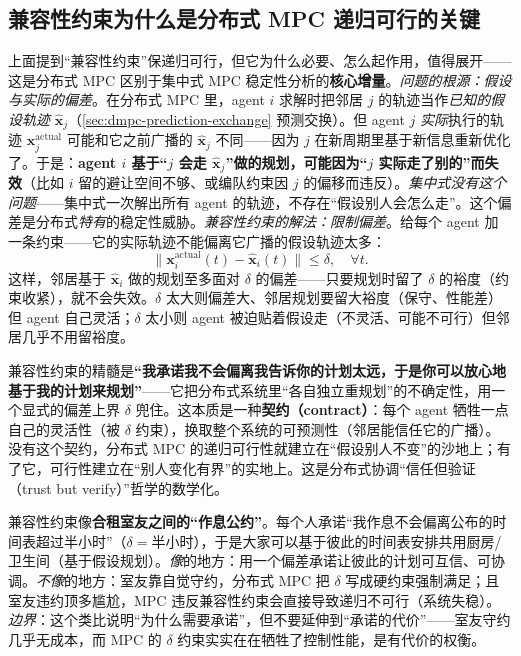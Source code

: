 \subsection{兼容性约束为什么是分布式 MPC 递归可行的关键}
\label{sec:dmpc-compat}

上面提到“兼容性约束”保递归可行，但它为什么必要、怎么起作用，值得展开——这是分布式 MPC 区别于集中式 MPC 稳定性分析的\textbf{核心增量}。\emph{问题的根源：假设与实际的偏差}。在分布式 MPC 里，agent $i$ 求解时把邻居 $j$ 的轨迹当作\emph{已知的假设轨迹} $\hat{\mathbf{x}}_j$（\cref{sec:dmpc-prediction-exchange} 预测交换）。但 agent $j$ \emph{实际}执行的轨迹 $\mathbf{x}_j^{\text{actual}}$ 可能和它之前广播的 $\hat{\mathbf{x}}_j$ 不同——因为 $j$ 在新周期里基于新信息重新优化了。于是：\textbf{agent $i$ 基于“$j$ 会走 $\hat{\mathbf{x}}_j$”做的规划，可能因为“$j$ 实际走了别的”而失效}（比如 $i$ 留的避让空间不够、或编队约束因 $j$ 的偏移而违反）。\emph{集中式没有这个问题}——集中式一次解出所有 agent 的轨迹，不存在“假设别人会怎么走”。这个偏差是分布式\emph{特有}的稳定性威胁。\emph{兼容性约束的解法：限制偏差}。给每个 agent 加一条约束——它的实际轨迹不能偏离它广播的假设轨迹太多：
\begin{equation}
  \|\mathbf{x}_i^{\text{actual}}(t)-\hat{\mathbf{x}}_i(t)\|\le\delta,\quad\forall t.
  \label{eq:dmpc-compat}
\end{equation}
这样，邻居基于 $\hat{\mathbf{x}}_i$ 做的规划至多面对 $\delta$ 的偏差——只要规划时留了 $\delta$ 的裕度（约束收紧），就不会失效。$\delta$ 太大则偏差大、邻居规划要留大裕度（保守、性能差）但 agent 自己灵活；$\delta$ 太小则 agent 被迫贴着假设走（不灵活、可能不可行）但邻居几乎不用留裕度。

\begin{insight}\label{ins:dmpc-contract}
兼容性约束的精髓是\textbf{“我承诺我不会偏离我告诉你的计划太远，于是你可以放心地基于我的计划来规划”}——它把分布式系统里“各自独立重规划”的不确定性，用一个显式的偏差上界 $\delta$ 兜住。这本质是一种\textbf{契约（contract）}：每个 agent 牺牲一点自己的灵活性（被 $\delta$ 约束），换取整个系统的可预测性（邻居能信任它的广播）。没有这个契约，分布式 MPC 的递归可行性就建立在“假设别人不变”的沙地上；有了它，可行性建立在“别人变化有界”的实地上。这是分布式协调“信任但验证（trust but verify）”哲学的数学化。
\end{insight}

\begin{insight}\label{ins:dmpc-roommate}
兼容性约束像\textbf{合租室友之间的“作息公约”}。每个人承诺“我作息不会偏离公布的时间表超过半小时”（$\delta=$半小时），于是大家可以基于彼此的时间表安排共用厨房/卫生间（基于假设规划）。\emph{像}的地方：用一个偏差承诺让彼此的计划可互信、可协调。\emph{不像}的地方：室友靠自觉守约，分布式 MPC 把 $\delta$ 写成硬约束强制满足；且室友违约顶多尴尬，MPC 违反兼容性约束会直接导致递归不可行（系统失稳）。\emph{边界}：这个类比说明“为什么需要承诺”，但不要延伸到“承诺的代价”——室友守约几乎无成本，而 MPC 的 $\delta$ 约束实实在在牺牲了控制性能，是有代价的权衡。
\end{insight}

